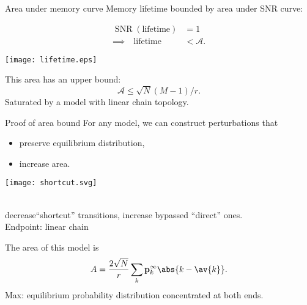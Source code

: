 \documentclass{beamer}%
\DeclareMathOperator{\SNR}{SNR}
\newcommand{\pr}{\mathbf{p}}
\newcommand{\eq}{\pr^\infty}
\newcommand{\area}{\mathcal{A}}
\begin{document}

\begin{frame}{Area under memory curve}
%
  Memory lifetime bounded by area under SNR curve:\\
  \vp\parbox{5cm}{
  \begin{equation*}
  \begin{aligned}
    \SNR(\text{lifetime})&=1
    \\
    \implies
    \quad
    \text{lifetime} &< \area.
  \end{aligned}
  \end{equation*}
  }
  \parbox{6.5cm}{
    \texttt{[image: lifetime.eps]}
  }

  \vp This area has an upper bound:
  \begin{equation*}
    \area \leq \sqrt{N}(M-1)/r.
  \end{equation*}
  Saturated by a model with linear chain topology.
%
\end{frame}


\begin{frame}[label=fr_areaproof]{Proof of area bound}
%
 For any model, we can construct perturbations that
 \parbox[c]{5cm}{
  \begin{itemize}
    \item preserve equilibrium distribution,
    \item increase area.
  \end{itemize}
  \hyperlink{fr_tech}{}
 }
 \parbox[c]{5cm}{
  \begin{center}
    \texttt{[image: shortcut.svg]}
  \end{center}
 }\\
 \eg decrease``shortcut'' transitions, increase bypassed ``direct'' ones.\\
 Endpoint: linear chain

 \vp The area of this model is
 \begin{equation*}
   A = \frac{2\sqrt{N}}{r}\sum_k \eq_k \abs{k-\av{k}}.
 \end{equation*}
 \note[item]{max given $\eq$}
 \note[item]{now max \wrt $\eq$}
 Max: equilibrium probability distribution concentrated at both ends.
 \\
%
\end{frame}
\end{document}
